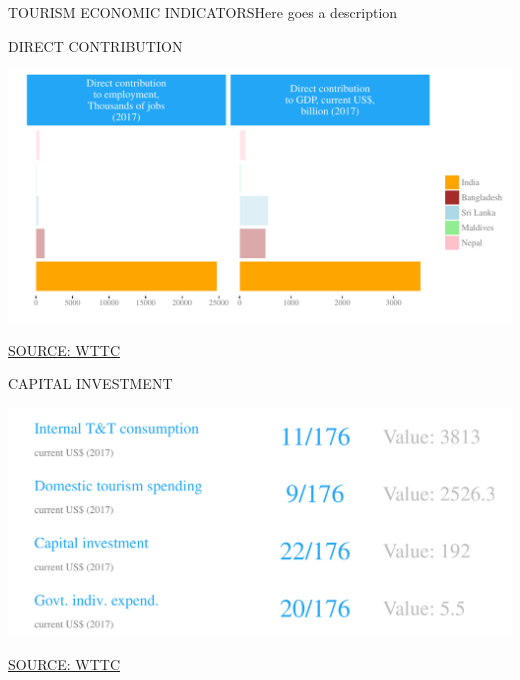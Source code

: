\documentclass{article}\usepackage[]{graphicx}\usepackage[]{color}
\makeatletter
\def\maxwidth{ %
  \ifdim\Gin@nat@width>\linewidth
    \linewidth
  \else
    \Gin@nat@width
  \fi
}
\makeatother
\begin{document}
\clearpage

\begin{minipage}[c]{0.95\textwidth}
  \vspace{5ex}
  \begin{flushleft}  
    \hspace{4ex}\Large{\textcolor[HTML]{722FF5}{TOURISM ECONOMIC INDICATORS}}\hspace{2ex}\small{\textcolor[HTML]{818181}{Here goes a description}}
  \end{flushleft}
    \begin{minipage}[c]{0.5\textwidth}
      \hspace{4ex}\small{\textcolor[HTML]{818181}{DIRECT CONTRIBUTION}}
      \vspace{1ex}


{\centering \includegraphics[width=\maxwidth]{figure/bar_wrap2-1} 

}



      \hspace{4ex}\scriptsize{\href{NA}{\textcolor[HTML]{722FF5}{SOURCE: WTTC}}}
    \end{minipage}
    \begin{minipage}[c]{0.5\textwidth}  
      \hspace{4ex}\small{\textcolor[HTML]{818181}{CAPITAL INVESTMENT}}
    \vspace{1ex}


{\centering \includegraphics[width=\maxwidth]{figure/number4-1} 

}



      \hspace{4ex}\scriptsize{\href{NA}{\textcolor[HTML]{722FF5}{SOURCE: WTTC}}}
    \end{minipage}
\end{minipage}
\end{document}
